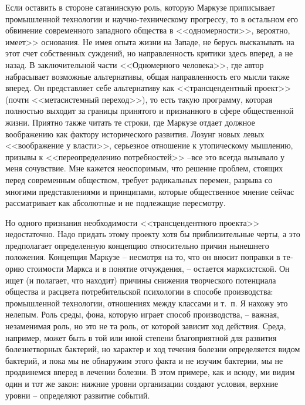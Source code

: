 \documentclass{book}
\begin{document}
Если оставить в стороне сатанинскую роль, которую Маркузе приписывает промышленной технологии и научно-техниче­скому прогрессу, то в остальном его обвинение современного западного общества в <<одномерности>>, вероятно, имеет>> осно­вания. Не имея опыта жизни на Западе, не берусь высказывать на этот счет собственных суждений, но направленность критики здесь вперед, а не назад. В заключительной части <<Одномерно­го человека>>, где автор набрасывает возможные альтернативы, общая направленность его мысли также вперед. Он представ­ляет себе альтернативу как <<трансцендентный проект>> (почти <<метасистемный переход>>), то есть такую программу, кото­рая полностью выходит за границы принятого и признанного в сфере общественной жизни. Приятно также читать те строки, где Маркузе отдает должное воображению как фактору исто­рического развития. Лозунг новых левых <<воображение у власти>>, серьезное отношение к утопическому мышлению, призывы к <<переопределению потребностей>> --все это всегда вызывало у меня сочувствие. Мне кажется 
неоспоримым, что решение проблем, стоящих перед современным обществом, требует радикальных перемен, разрыва со многими представ­лениями и принципами, которые общественное мнение сейчас рассматривает как абсолютные и не подлежащие пересмотру.

Но одного признания необходимости <<трансцендентного проекта>> недостаточно. Надо придать этому проекту хотя бы приблизительные черты, а это предполагает определенную кон­цепцию относительно причин нынешнего положения. Концеп­ция Маркузе -- несмотря на то, что он вносит поправки в те­орию стоимости Маркса и в понятие отчуждения, -- остается марксистской. Он ищет (и полагает, что находит) причины снижения творческого потенциала общества и расцвета потре­бительской психологии в способе производства: промышлен­ной технологии, отношениях между классами и т.~п. Я нахожу это нелепым. Роль среды, фона, которую играет способ произ­водства, -- важная, незаменимая роль, но это не та роль, от ко­торой зависит ход действия. Среда, например, может быть в той или иной степени благоприятной для развития болезнетвор­ных бактерий, но характер и ход течения болезни определяется видом бактерий, и пока мы не обнаружим этого факта и не изучим бактерии, мы не продвинемся вперед в лечении болезни. В этом примере, как и всюду, ми 
видим один и тот же закон: нижние уровни организации создают условия, верхние уровни -- определяют развитие событий.
\end{document}
